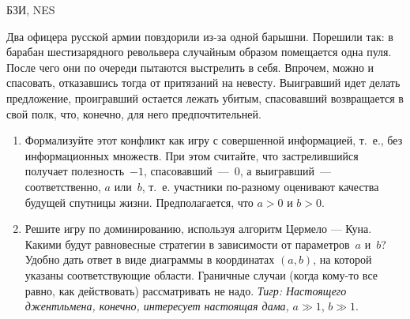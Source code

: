 \begin{problem}
\begin{source}
БЗИ, NES
\end{source}
 Два офицера русской армии
повздорили из-за одной барышни. Порешили так: в барабан
шестизарядного револьвера случайным образом помещается одна
пуля. После чего они по очереди пытаются выстрелить в себя.
Впрочем, можно и спасовать, отказавшись тогда от притязаний
на невесту. Выигравший идет делать предложение, проигравший
остается лежать убитым, спасовавший возвращается в свой
полк, что, конечно, для него предпочтительней.

\begin{enumerate}

\item Формализуйте этот конфликт как игру с {\rm
совершенной информацией}, т.~е., без информационных
множеств. При этом считайте, что застрелившийся получает
полезность~$-1$, спасовавший~---~$0$, а выигравший~---
соответственно, $a$ или~$b$, т.~е. участники по-разному
оценивают качества будущей спутницы жизни.
Предполагается, что $a>0$ и $b>0$.

\item  Решите игру по доминированию, используя алгоритм
Цермело --- Куна. Какими будут равновесные стратегии в
зависимости от параметров~$a$ и~$b$? Удобно дать ответ в
виде диаграммы в координатах $(a,b)$, на которой указаны
соответствующие области. Граничные случаи (когда кому-то
все равно, как действовать) рассматривать не надо.
{\it Тигр: Настоящего джентльмена, конечно, интересует настоящая дама, } $a\gg 1$, $b\gg 1$.

\end{enumerate}




\end{problem}
